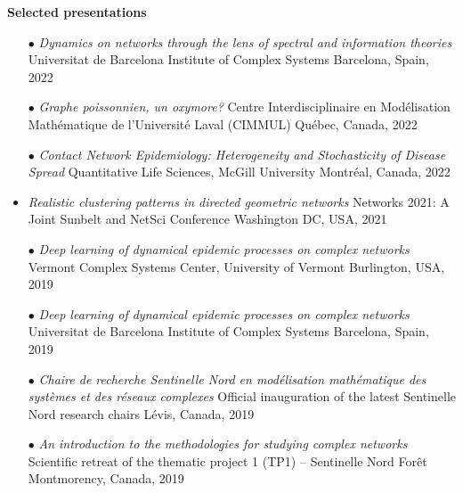 \documentclass[11pt]{article}
\begin{document}
%
%
%
\textbf{Selected presentations\footnotemark}
%
%
\begin{itemize}[itemsep=0.5em]
%
%
  \item[$\bullet$] \textit{Dynamics on networks through the lens of spectral and information theories}\split
  Universitat de Barcelona Institute of Complex Systems\split
  Barcelona, Spain, 2022
%
  \item[$\bullet$] \textit{Graphe poissonnien, un oxymore?}\split
  Centre Interdisciplinaire en Modélisation Mathématique de l'Université Laval (CIMMUL)\split
  Québec, Canada, 2022
%
  \item[$\bullet$] \textit{Contact Network Epidemiology: Heterogeneity and Stochasticity of Disease Spread}\split
  Quantitative Life Sciences, McGill University\split
  Montréal, Canada, 2022
%
  \item \textit{Realistic clustering patterns in directed geometric networks}\split
  Networks 2021: A Joint Sunbelt and NetSci Conference\split
  Washington DC, USA, 2021
%
  \item[$\bullet$] \textit{Deep learning of dynamical epidemic processes on complex networks}\split
  Vermont Complex Systems Center, University of Vermont\split
  Burlington, USA, 2019
%
  \item[$\bullet$] \textit{Deep learning of dynamical epidemic processes on complex networks}\split
  Universitat de Barcelona Institute of Complex Systems\split
  Barcelona, Spain, 2019
%
  \item[$\bullet$] \textit{Chaire de recherche Sentinelle Nord en modélisation mathématique des systèmes et des réseaux complexes}\split
  Official inauguration of the latest Sentinelle Nord research chairs\split
  L\'evis, Canada, 2019
%
  \item[$\bullet$] \textit{An introduction to the methodologies for studying complex networks}\split
  Scientific retreat of the thematic project 1 (TP1) – Sentinelle Nord\split
  For\^et Montmorency, Canada, 2019
%

\end{itemize}
\end{document}
